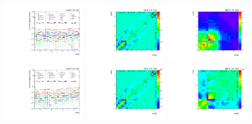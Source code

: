\begin{figure}[htb]
\begin{center}
 \includegraphics[width=0.32\textwidth]{fig_fullRun2UL/unfolding/combined/deltaSystCombinedlog_rebinnedB_b2k_mttbar.pdf}
 \includegraphics[width=0.32\textwidth]{fig_fullRun2UL/unfolding/combined/StatCovMatrix_rebinnedB_b2k_mttbar.pdf}
 \includegraphics[width=0.32\textwidth]{fig_fullRun2UL/unfolding/combined/TotalSystCovMatrix_rebinnedB_b2k_mttbar.pdf} \\
 \includegraphics[width=0.32\textwidth]{fig_fullRun2UL/unfolding/combined/deltaSystCombinedlogNorm_rebinnedB_b2k_mttbar.pdf}
 \includegraphics[width=0.32\textwidth]{fig_fullRun2UL/unfolding/combined/StatCovMatrixNorm_rebinnedB_b2k_mttbar.pdf}
 \includegraphics[width=0.32\textwidth]{fig_fullRun2UL/unfolding/combined/TotalSystCovMatrixNorm_rebinnedB_b2k_mttbar.pdf} \\

\end{center}
\end{figure}
